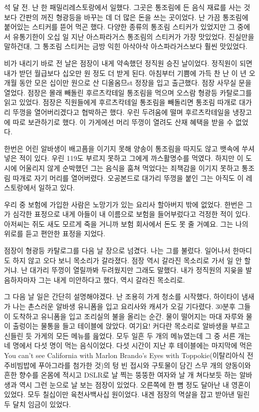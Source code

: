 \documentclass[a5paper,10pt, twoside, openright]{memoir}
\begin{document}
	석 달 전. 난 한 패밀리레스토랑에서 일했다. 그곳은 통조림에 든 음식 재료를 사는 것 보다 간판의 꺼진 형광등을 바꾸는 데 더 많은 돈을 쓰는 곳이었다. 난 가끔 통조림에 붙어있는 스티커를 뜯어 먹곤 했다. 다양한 종류의 통조림 스티커가 있었지만 그 중에서 유통기한이 오십 일 지난 아스파라거스 통조림의 스티커가 가장 맛있었다. 진실만을 말하건대, 그 통조림 스티커는 금방 익힌 아삭아삭 아스파라거스보다 훨씬 맛있었다. 

	비가 내리기 바로 전 날은 점장이 내게 약속했던 정직원 승진 날이었다. 정직원이 되면 내가 받던 월급보다 십오만 원 정도 더 받게 된다. 아침부터 기쁨에 가득 찬 난 이 년 오 개월 동안 모은 십이만 원으로 산 디올옴므st 정장을 입고 출근했다. 점장 사무실 문을 열었다. 점장은 몰래 빼돌린 후르츠칵테일 통조림을 먹으며 오스람 형광등 카탈로그를 읽고 있었다. 점장은 직원들에게 후르츠칵테일 통조림을 빼돌리면 통조림 따개로 대가리 뚜껑을 열어버리겠다고 협박하곤 했다. 우린 두려움에 떨며 후르츠칵테일을 냉장고에 따로 보관하기로 했다. 이 가게에선 머리 뚜껑이 열려도 산재 혜택을 받을 수 없었다. 

	한번은 어린 알바생이 배고픔을 이기지 못해 양송이 통조림을 따지도 않고 뱃속에 쑤셔 넣은 적이 있다. 우린 119도 부르지 못하고 그에게 까스활명수를 먹였다. 하지만 이 도시에 어울리지 않게 순박했던 그는 음식을 훔쳐 먹었다는 죄책감을 이기지 못하고 통조림 따개로 자기 머리를 열어버렸다. 오공본드로 대가리 뚜껑을 붙인 그는 아직도 이 레스토랑에서 일하고 있다. 

	우리 중 보험에 가입한 사람은 노망기가 있는 요리사 할아버지 밖에 없었다. 한번은 그가 심각한 표정으로 내게 아들이 내 이름으로 보험을 들어부렀다고 걱정한 적이 있다. 아저씨는 쥐도 새도 모르게 죽을 거니까 보험 회사에서 돈도 못 줄 거예요. 그는 나의 위로를 듣고 편안한 표정을 지었다. 
	
	점장이 형광등 카탈로그를 다음 날 장으로 넘겼다. 나는 그를 불렀다. 일어나서 한마디도 하지 않고 오다 보니 목소리가 갈라졌다. 점장 역시 갈라진 목소리로 가서 일 안 할거냐. 난 대가리 뚜껑이 열릴까봐 두려웠지만 그래도 말했다. 내가 정직원의 지읒을 발음하자마자 그는 내게 미안하다고 했다, 역시 갈라진 목소리로. 

	그 다음 날 일은 간단히 설명해야겠다. 난 조용히 가게 청소를 시작했다, 하이타이 냄새가 나는 촌스러운 알바생 유니폼을 입고 요리사와 캐셔가 오길 기다렸다. 30분후 그들이 도착하고 유니폼을 입고 조리실의 불을 올리는 순간. 물이 떨어지는 마대 자루와 물이 출렁이는 물통을 들고 테이블에 앉았다. 여기요! 커다란 목소리로 알바생을 부르고 신들린 듯 가게의 모든 메뉴를 읊었다. 모두 일흔 두 개의 메뉴였는데 그 중 서른 개는 네 명에서 다섯 명이 먹는 음식이었다. 다섯 시간이 지난 후 테이블에는 마지막에 먹은 You can't see California with Marlon Brando's Eyes with Toppokie(이탈리아식 전주비빔밥에 푸아그라를 첨가한 것)의 텅 빈 접시와 구토물이 담긴 스무 개의 양동이와 흔한 향수를 온몸에 적시고 DSLR로 날 찍는 뚱뚱한 여자와 날 개 쳐다보듯 하는 알바생과 역시 그런 눈으로 날 보는 점장이 있었다. 오른쪽에 한 뼘 정도 달아난 내 영혼이 있었다. 모두 칠십이만 육천사백사십 원이었다. 내겐 점장의 멱살을 잡고 받아낸 밀린 두 달치 임금이 있었다.
\end{document}
